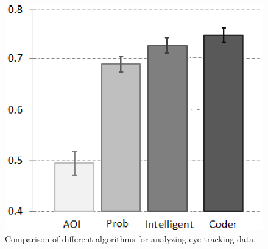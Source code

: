 \begin{figure}[htb]
  \centering
  \includegraphics[width=0.5\linewidth]{images/algosComparison.eps}
  \caption{Comparison of different algorithms for analyzing eye tracking data.}
	\label{fig:quantitative}
\end{figure}


